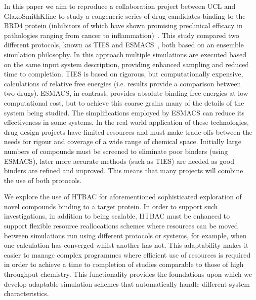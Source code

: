 In this paper we aim to reproduce a collaboration project between UCL and
GlaxoSmithKline to study a congeneric series of drug candidates binding to the
BRD4 protein (inhibitors of which have shown promising preclinical efficacy in
pathologies ranging from cancer to inflammation)~\cite{Wan2017brd4}. This
study compared two different protocols, known as TIES and
ESMACS~\cite{Wan2017brd4, Bhati2017}, both based on an ensemble simulation
philosophy. In this approach multiple simulations are executed based on the
same input system description, providing enhanced sampling and reduced time to
completion. TIES is based on rigorous, but computationally expensive,
calculations of relative free energies (i.e. results provide a comparison
between two drugs). ESMACS, in contrast, provides absolute binding free
energies at low computational cost, but to achieve this coarse grains many of
the details of the system being studied. The simplifications employed by
ESMACS can reduce its effectiveness in some systems. In the real world
application of these technologies, drug design projects have limited resources
and must make trade-offs between the needs for rigour and coverage of a wide
range of chemical space. Initially large numbers of compounds must be screened
to eliminate poor binders (using ESMACS), later more accurate methods (such as
TIES) are needed as good binders are refined and improved. This means that
many projects will combine the use of both protocols.

We explore the use of HTBAC for aforementioned sophisticated exploration of
novel compounds binding to a target protein. In order to support such
investigations, in addition to being scalable, HTBAC must be enhanced to
support flexible resource reallocations schemes where resources can be moved
between simulations run using different protocols or systems, for example,
when one calculation has converged whilst another has not. This adaptability
makes it easier to manage complex programmes where efficient use of resources
is required in order to achieve a time to completion of studies comparable to
those of high throughput chemistry. This functionality provides the
foundations upon which we develop adaptable simulation schemes that
automatically handle different system characteristics.

